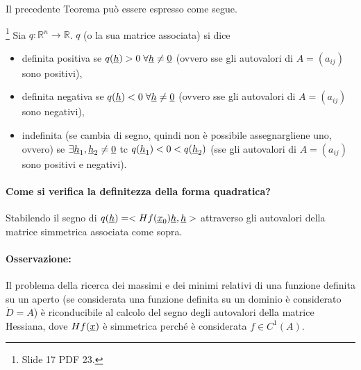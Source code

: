 Il precedente Teorema può essere espresso come segue.

\begin{definition}\footnote{Slide 17 PDF 23.}
	Sia $q:\mathbb{R}^n\rightarrow\mathbb{R}$. $q$ (o la sua matrice associata) si dice
	\begin{itemize}
		\item definita positiva se $q(\uline h)>0 \;\forall \uline h\neq \uline 0$ (ovvero sse gli autovalori di $A=(a_{ij})$ sono positivi),
		\item definita negativa se $q(\uline h)<0 \;\forall \uline h\neq \uline 0$ (ovvero sse gli autovalori di $A=(a_{ij})$ sono negativi),
		\item indefinita (se cambia di segno, quindi non è possibile assegnargliene uno, ovvero) se $\exists \uline h_1,\uline h_2\neq \uline 0$ tc $q(\uline h_1)<0<q(\uline h_2)$ (sse gli autovalori di $A=(a_{ij})$ sono positivi e negativi).
	\end{itemize}
\end{definition}

\paragraph{Come si verifica la definitezza della forma quadratica?} Stabilendo il segno di $q(\uline h)=<Hf(\uline x_0)\uline h, \uline h>$ attraverso gli autovalori della matrice simmetrica associata come sopra.

\paragraph{Osservazione:} Il problema della ricerca dei massimi e dei minimi relativi di una funzione definita su un aperto (se considerata una funzione definita su un dominio è considerato $\mathring{D}=A$) è riconducibile al calcolo del segno degli autovalori della matrice Hessiana, dove $Hf(\uline x)$ è simmetrica perché è considerata $f\in C^1(A)$.

